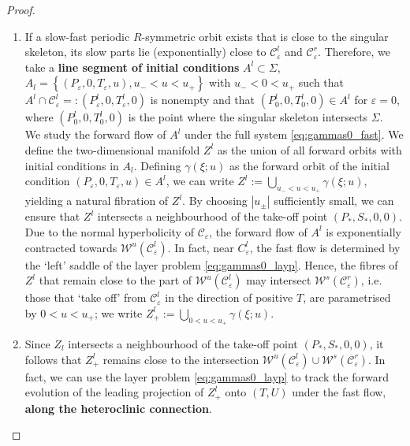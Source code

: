 \documentclass[a4paper,10pt,abstract=true,parskip=true]{scrartcl}
\theoremstyle{remark}
\numberwithin{equation}{section}
\numberwithin{thm}{section}
\newcommand{\eps}{\varepsilon}
\begin{document}
\begin{proof}
\begin{enumerate}
\begin{equation}
    \end{equation}
    From this equation, we see that $j_1(P,-S;\eps) = - j_1(P,S;\eps)$, from which it follows that $j_1(P,0;\eps) = 0$. We conclude that $\mathcal{C}_\eps \cup \left\{S=0\right\} = \left\{(P,0,h(P)+\eps\,h_1(P,0;\eps),\eps\,j_1(P,0;\eps)\right\} \subset \Sigma$.
    \item If a slow-fast periodic $R$-symmetric orbit exists that is close to the singular skeleton, its slow parts lie (exponentially) close to $\mathcal{C}_\eps^l$ and $\mathcal{C}_\eps^r$. Therefore, we take a \textbf{line segment of initial conditions} $A^l \subset \Sigma$, $A_l = \left\{(P_\eps,0,T_\eps,u), u_- < u < u_+\right\}$ with $u_-<0<u_+$ such that $A^l \cap \mathcal{C}_\eps^l =: (P^l_\eps,0,T^l_\eps,0)$ is nonempty and that $(P^l_0,0,T^l_0,0) \in A^l$ for $\eps=0$, where $(P^l_0,0,T^l_0,0)$ is the point where the singular skeleton intersects $\Sigma$.\\
    We study the forward flow of $A^l$ under the full system \eqref{eq:gammas0_fast}. We define the two-dimensional manifold $Z^l$ as the union of all forward orbits with initial conditions in $A_l$. Defining $\gamma(\xi;u)$ as the forward orbit of the initial condition $(P_\eps,0,T_\eps,u) \in A^l$, we can write $Z^l := \bigcup_{u_- < u < u_+} \gamma(\xi;u)$, yielding a natural fibration of $Z^l$. By choosing $|u_\pm|$ sufficiently small, we can ensure that $Z^l$ intersects a neighbourhood of the take-off point $(P_*,S_*,0,0)$.\\
    Due to the normal hyperbolicity of $\mathcal{C}_\eps$, the forward flow of $A^l$ is exponentially contracted towards $\mathcal{W}^u(\mathcal{C}_\eps^l)$. In fact, near $C_\eps^l$, the fast flow is determined by the `left' saddle of the layer problem \eqref{eq:gammas0_layp}. Hence, the fibres of $Z^l$ that remain close to the part of $\mathcal{W}^u(\mathcal{C}_\eps^l)$ may intersect $\mathcal{W}^s(\mathcal{C}_\eps^r)$, i.e. those that `take off' from $\mathcal{C}_\eps^l$ in the direction of positive $T$, are parametrised by $0<u<u_+$; we write $Z^l_+ := \bigcup_{0 < u < u_+} \gamma(\xi;u)$.
    \item Since $Z_l$ intersects a neighbourhood of the take-off point $(P_*,S_*,0,0)$, it follows that $Z^l_+$ remains close to the intersection $\mathcal{W}^u(\mathcal{C}_\eps^l) \cup \mathcal{W}^s(\mathcal{C}_\eps^r)$. In fact, we can use the layer problem \eqref{eq:gammas0_layp} to track the forward evolution of the leading projection of $Z^l_+$ onto $(T,U)$ under the fast flow, \textbf{along the heteroclinic connection}.\\

\end{enumerate}
\end{proof}
\end{document}
